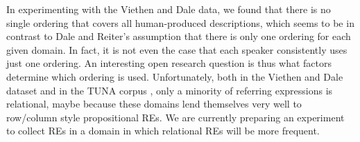 In experimenting with the Viethen and Dale data, we found that
there is no single ordering that covers all human-produced
descriptions, which seems to be in contrast to Dale and Reiter's
 assumption that there is only one ordering for
each given domain.  In fact, it is not even the case that each speaker
consistently uses just one ordering.  An interesting open research
question is thus what factors determine which ordering is used.
Unfortunately, both in the Viethen and Dale dataset and in the TUNA
corpus \cite{deemter06:_build_seman_trans_corpus_for}, only a minority
of referring expressions is relational, maybe because these domains
lend themselves very well to row/column style propositional REs.  We
are currently preparing an experiment to collect REs in a domain in
which relational REs will be more frequent.



